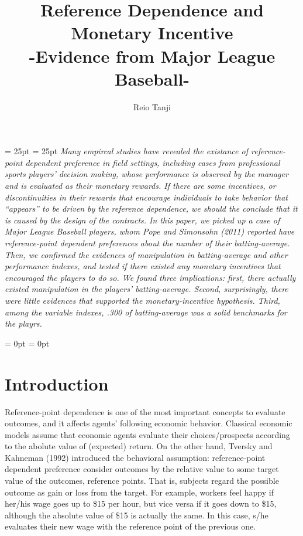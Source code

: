 \documentclass[dvipdfmx, 12pt]{article}
\begin{document}
\title{Reference Dependence and Monetary Incentive \\
-Evidence from Major League Baseball-}
\author{Reio Tanji}
\date{}
\maketitle

\leftskip = 25pt
\rightskip = 25pt
  \small
  \textit{
  Many empircal studies have revealed the existance of reference-point dependent preference in field settings, including cases from professional sports players' decision making, whose performance is observed by the manager and is evaluated as their monetary rewards. If there are some incentives, or discontinuities in their rewards that encourage individuals to take behavior that ``appears'' to be driven by the reference dependence, we should the conclude that it is caused by the design of the contracts. In this paper, we picked up a case of Major League Baseball players, whom Pope and Simonsohn (2011) reported have reference-point dependent preferences about the number of their batting-average. Then, we confirmed the evidences of manipulation in batting-average and other performance indexes, and tested if there existed any monetary incentives that encouraged the players to do so. We found three implications: first, there actually existed manipulation in the players' batting-average. Second, surprisingly, there were little evidences that supported the monetary-incentive hypothesis. Third, among the variable indexes, .300 of batting-average was a solid benchmarks for the playrs.
  }

\leftskip = 0pt
\rightskip = 0pt
\normalsize


\section{Introduction}

Reference-point dependence is one of the most important concepts to evaluate outcomes, and it affects agents' following economic behavior. Classical economic models assume that economic agents evaluate their choices/prospects according to the abolute value of (expected) return. On the other hand, Tversky and Kahneman (1992) introduced the behavioral assumption: reference-point dependent preference consider outcomes by the relative value to some target value of the outcomes, reference points. That is, subjects regard the possible outcome as gain or loss from the target. For example, workers feel happy if her/his wage goes up to \$15 per hour, but vice versa if it goes down to \$15, although the absolute value of \$15 is actually the same. In this case, s/he evaluates their new wage with the reference point of the previous one.
\end{document}
